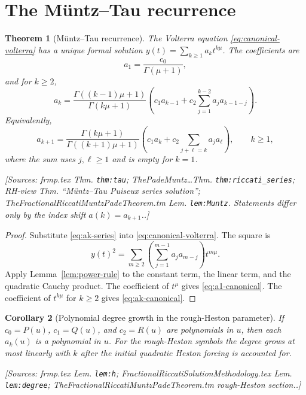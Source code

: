\documentclass[11pt]{article}
\newtheorem{theorem}{Theorem}[section]
\newtheorem{corollary}[theorem]{Corollary}
\theoremstyle{definition}
\newcommand{\Source}[1]{\par\smallskip\noindent\textup{[Sources: #1.]}}
\begin{document}
\section{The Müntz--Tau recurrence}

\begin{theorem}[Müntz--Tau recurrence]\label{thm:tau}
The Volterra equation \eqref{eq:canonical-volterra} has a unique formal solution
$y(t)=\sum_{k\ge1}a_kt^{k\mu}$.
The coefficients are
\begin{equation}\label{eq:a1-canonical}
        a_1=\frac{c_0}{\Gamma(\mu+1)},
\end{equation}
and for $k\ge2$,
\begin{equation}\label{eq:ak-canonical}
        a_k=\frac{\Gamma((k-1)\mu+1)}{\Gamma(k\mu+1)}
        \left(c_1a_{k-1}+c_2\sum_{j=1}^{k-2}a_ja_{k-1-j}\right).
\end{equation}
Equivalently,
\begin{equation}\label{eq:ak-shifted}
        a_{k+1}=\frac{\Gamma(k\mu+1)}{\Gamma((k+1)\mu+1)}
        \left(c_1a_k+c_2\sum_{j+\ell=k}a_ja_\ell\right),
        \qquad k\ge1,
\end{equation}
where the sum uses $j,\ell\ge1$ and is empty for $k=1$.
\Source{frmp.tex Thm. \texttt{thm:tau}; ThePadeMuntz\ldots Thm. \texttt{thm:riccati\_series}; RH-view Thm. ``Müntz--Tau Puiseux series solution''; TheFractionalRiccatiMuntzPadeTheorem.tm Lem. \texttt{lem:Muntz}. Statements differ only by the index shift $a(k)=a_{k+1}$.}
\end{theorem}

\begin{proof}
Substitute \eqref{eq:ak-series} into \eqref{eq:canonical-volterra}.
The square is
\[
        y(t)^2=\sum_{m\ge2}\left(\sum_{j=1}^{m-1}a_ja_{m-j}\right)t^{m\mu}.
\]
Apply Lemma~\ref{lem:power-rule} to the constant term,
the linear term,
and the quadratic Cauchy product.
The coefficient of $t^{\mu}$ gives \eqref{eq:a1-canonical}.
The coefficient of $t^{k\mu}$ for $k\ge2$ gives \eqref{eq:ak-canonical}.
\end{proof}

\begin{corollary}[Polynomial degree growth in the rough-Heston parameter]\label{cor:degree-growth}
If $c_0=P(u)$,
$c_1=Q(u)$,
and $c_2=R(u)$ are polynomials in $u$,
then each $a_k(u)$ is a polynomial in $u$.
For the rough-Heston symbols the degree grows at most linearly with $k$ after the initial quadratic Heston forcing is accounted for.
\Source{frmp.tex Lem. \texttt{lem:h}; FractionalRiccatiSolutionMethodology.tex Lem. \texttt{lem:degree}; TheFractionalRiccatiMuntzPadeTheorem.tm rough-Heston section.}
\end{corollary}
\end{document}
